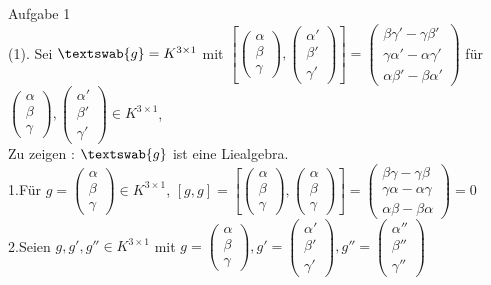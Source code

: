 \documentclass[12pt,leqno,twoside]{book}
\newcommand{\g}{\textswab{g}}
\begin{document}
Aufgabe 1\\	
(1). Sei $\g=K^{3\times1}$ mit $\left[\left(\begin{array}{c} \alpha \\ \beta \\ \gamma \end{array}\right),\left(\begin{array}{c} \alpha' \\ \beta' \\ \gamma' \end{array}\right)\right]=\left(\begin{array}{c} \beta\gamma'-\gamma\beta' \\ \gamma\alpha'-\alpha\gamma' \\ \alpha\beta'-\beta\alpha' \end{array}\right)$ f\"{u}r $\left(\begin{array}{c} \alpha \\ \beta \\ \gamma \end{array}\right),\left(\begin{array}{c} \alpha' \\ \beta' \\ \gamma' \end{array}\right)\in K^{3\times1}$, 
\\Zu zeigen : $\g$ ist eine Liealgebra.\\
1.F\"{u}r $g=\left(\begin{array}{c} \alpha \\ \beta \\ \gamma \end{array}\right)\in K^{3\times1}$, $[g,g]=\left[\left(\begin{array}{c} \alpha \\ \beta \\ \gamma \end{array}\right),\left(\begin{array}{c} \alpha \\ \beta \\ \gamma \end{array}\right)\right]=\left(\begin{array}{c} \beta\gamma-\gamma\beta \\ \gamma\alpha-\alpha\gamma \\ \alpha\beta-\beta\alpha \end{array}\right)=0$\\
2.Seien $g,g',g''\in K^{3\times1}$ mit $g=\left(\begin{array}{c} \alpha \\ \beta \\ \gamma \end{array}\right),g'=\left(\begin{array}{c} \alpha' \\ \beta' \\ \gamma' \end{array}\right),g''=\left(\begin{array}{c} \alpha'' \\ \beta'' \\ \gamma'' \end{array}\right)$\\
\end{document}
